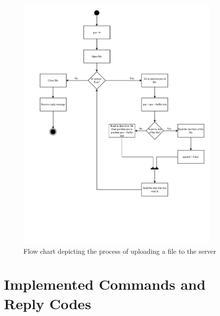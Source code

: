 \documentclass[10pt,twocolumn]{witseiepaper}
\begin{document}
\begin{appendix}
\begin{figure}[h]
	\centering
	\includegraphics[width=0.9\textwidth]{uploadfile.pdf}
	\caption{Flow chart depicting the process of uploading a file to the server}
	\raggedright
	\label{fig:upload}	
\end{figure}

\newpage
\section{Implemented Commands and Reply Codes}
\setcounter{table}{0}
\renewcommand{\thetable}{B\arabic{table}}


\end{appendix}
\end{document}
